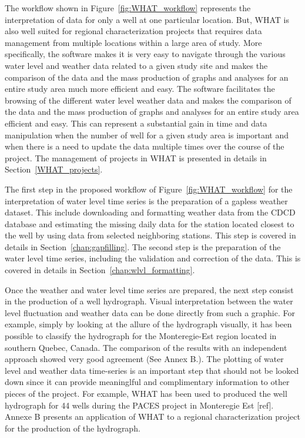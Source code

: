 \documentclass[WHATMANUAL.tex]{subfiles}
\begin{document}
The workflow shown in Figure~\ref{fig:WHAT_workflow} represents the interpretation of data for only a well at one particular location. But, WHAT is also well suited for regional characterization projects that requires data management from multiple locations within a large area of study. More specifically, the software makes it is very easy to navigate through the various water level and weather data related to a given study site and makes the comparison of the data and the mass production of graphs and analyses for an entire study area much more efficient and easy. The software facilitates the browsing of the different water level  weather data and makes the comparison of the data and the mass production of graphs and analyses for an entire study area efficient and easy. This can represent a substantial gain in time and data manipulation when the number of well for a given study area is important and when there is a need to update the data multiple times over the course of the project. The management of projects in WHAT is presented in details in Section~\ref{WHAT_projects}.

The first step in the proposed workflow of Figure~\ref{fig:WHAT_workflow} for the interpretation of water level time series is the preparation of a gapless weather dataset. This include downloading and formatting weather data from the CDCD database and estimating the missing daily data for the station located closest to the well by using data from selected neighboring stations. This step is covered in details in Section~\ref{chap:gapfilling}. The second step is the preparation of the water level time series, including the validation and correction of the data. This is covered in details in Section~\ref{chap:wlvl_formatting}.

Once the weather and water level time series are prepared, the next step consist in the production of a well hydrograph. Visual interpretation between the water level  fluctuation and weather data can be done directly from such a graphic. For example, simply by looking at the allure of the hydrograph visually, it has been possible to classify the hydrograph for the Monteregie-Est region located in southern Quebec, Canada. The comparison of the results with an independent approach showed very good agreement (See Annex B.). The plotting of water level and weather data time-series is an important step that should not be looked down since it can provide meaninglful and complimentary information to other pieces of the project. For example, WHAT has been used to produced the well hydrograph for 44 wells during the PACES project in Monteregie Est [ref]. Annexe B presents an application of WHAT to a regional characterization project for the production of the hydrograph.
\end{document}
